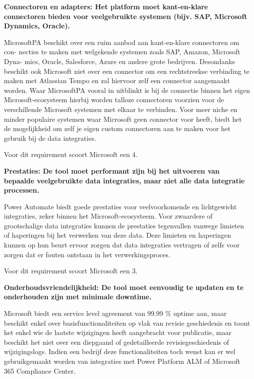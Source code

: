 \textbf{Connectoren en adapters: Het platform moet kant-en-klare connectoren bieden voor veelgebruikte systemen (bijv. SAP, Microsoft Dynamics, Oracle).}
\vspace{\baselineskip}

MicrosoftPA beschikt over een ruim aanbod aan kant-en-klare connectoren om con-
necties te maken met welgekende systemen zoals SAP, Amazon, Microsoft Dyna-
mics, Oracle, Salesforce, Azure en andere grote bedrijven. Desondanks beschikt ook Microsoft niet over een connector om een rechtstreekse verbinding te maken met Atlassian Tempo en zal hiervoor zelf een connector aangemaakt worden. Waar MicrosoftPA vooral in uitblinkt is bij de connectie binnen het eigen Microsoft-ecosysteem hierbij worden talloze connectoren voorzien voor de verschillende Microsoft systemen met elkaar te verbinden. Voor meer niche en minder populaire systemen waar Microsoft geen connector voor heeft, biedt het de mogelijkheid om zelf je eigen custom connectoren aan te maken voor het gebruik bij de data integraties.


Voor dit requirement scoort Microsoft een 4.

\vspace{\baselineskip}

\textbf{Prestaties: De tool moet performant zijn bij het uitvoeren van bepaalde veelgebruikte data integraties, maar niet alle data integratie processen.}

\vspace{\baselineskip}

Power Automate biedt goede prestaties voor veelvoorkomende en lichtgewicht integraties, zeker binnen het Microsoft-ecosysteem. Voor zwaardere of grootschalige data integraties kunnen de prestaties tegenvallen vanwege limieten of haperingen bij het verwerken van deze data. Deze limieten en haperingen kunnen op hun beurt ervoor zorgen dat data integraties vertragen of zelfs voor zorgen dat er fouten ontstaan in het verwerkingsproces.

Voor dit requirement scoort Microsoft een 3.

\vspace{\baselineskip}

\textbf{Onderhoudsvriendelijkheid: De tool moet eenvoudig te updaten en te onderhouden zijn met minimale downtime.}

\vspace{\baselineskip}

Microsoft biedt een service level agreement van 99.99 \% uptime aan, maar beschikt enkel over basisfunctionaliteiten op vlak van revisie geschiedenis en toont het enkel wie de laatste wijzigingen heeft aangebracht voor publicatie, maar beschikt het niet over een diepgaand of gedetailleerde revisiegeschiedenis of wijzigingslogs. Indien een bedrijf deze functionaliteiten toch wenst kan er wel gebruikgemaakt worden van integraties met Power Platform ALM of Microsoft 365 Compliance Center.


